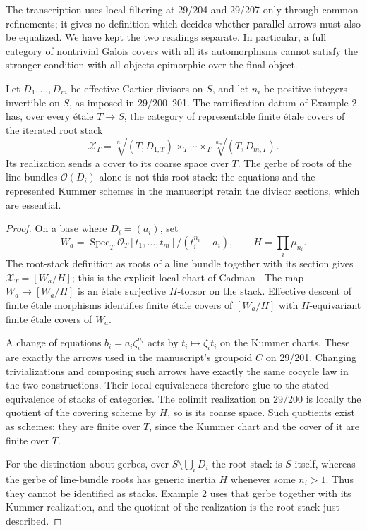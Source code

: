 The transcription uses local filtering at 29/204 and 29/207 only
through common refinements; it gives no definition which decides
whether parallel arrows must also be equalized. We have kept the
two readings separate. In particular, a full category of nontrivial
Galois covers with all its automorphisms cannot satisfy the stronger
condition with all objects epimorphic over the final object.

\begin{proposition}
\label{D:root-stacks}
Let $D_1,\ldots,D_m$ be effective Cartier divisors on $S$, and let
$n_i$ be positive integers invertible on $S$, as imposed in 29/200--201.
The ramification datum of Example 2 has, over every \'etale $T\to S$,
the category of representable finite \'etale covers of the iterated
root stack
\[
 \mathcal X_T=
 \sqrt[n_1]{(T,D_{1,T})}\times_T\cdots\times_T
 \sqrt[n_m]{(T,D_{m,T})}.
\]
Its realization sends a cover to its coarse space over $T$.
The gerbe of roots of the line bundles $\mathcal O(D_i)$ alone is
not this root stack: the equations and the represented Kummer schemes
in the manuscript retain the divisor sections, which are essential.
\end{proposition}
\begin{proof}
On a base where $D_i=(a_i)$, set
\[
 W_a=\operatorname{Spec}_T
 \mathcal O_T[t_1,\ldots,t_m]/(t_i^{n_i}-a_i),\qquad
 H=\prod_i\mu_{n_i}.
\]
The root-stack definition as roots of a line bundle together with
its section gives $\mathcal X_T=[W_a/H]$; this is the explicit
local chart of Cadman \cite[Definition 2.2.4, Example 2.4.1]{Cadman2007}.
The map $W_a\to[W_a/H]$ is an \'etale surjective $H$-torsor
on the stack. Effective descent of finite \'etale morphisms identifies
finite \'etale covers of $[W_a/H]$ with $H$-equivariant finite
\'etale covers of $W_a$.

A change of equations $b_i=a_i\zeta_i^{n_i}$ acts by
$t_i\mapsto\zeta_i t_i$ on the Kummer charts. These are exactly
the arrows used in the manuscript's groupoid $C$ on 29/201.
Changing trivializations and composing such arrows have exactly the
same cocycle law in the two constructions. Their local equivalences
therefore glue to the stated equivalence of stacks of categories.
The colimit realization on 29/200 is locally the quotient of the
covering scheme by $H$, so is its coarse space. Such quotients exist
as schemes: they are finite over $T$, since the Kummer chart and the
cover of it are finite over $T$.

For the distinction about gerbes, over $S\setminus\bigcup_iD_i$
the root stack is $S$ itself, whereas the gerbe of line-bundle roots
has generic inertia $H$ whenever some $n_i>1$. Thus they cannot be
identified as stacks. Example 2 uses that gerbe together with its
Kummer realization, and the quotient of the realization is the
root stack just described.
\end{proof}


